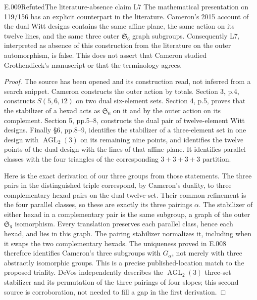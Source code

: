 \begin{saresult}{E.009}{Refuted}{The literature-absence claim L7}
The mathematical presentation on 119/156 has an explicit counterpart
in the literature. Cameron's 2015 account of the dual Witt designs
contains the same affine plane, the same action on its twelve lines,
and the same three outer $\mathfrak S_6$ graph subgroups. Consequently
L7, interpreted as absence of this construction from the literature on
the outer automorphism, is false. This does not assert that Cameron
studied Grothendieck's manuscript or that the terminology agrees.
\end{saresult}
\begin{proof}
The source has been opened and its construction read, not inferred
from a search snippet. Cameron \cite[\S2, pp.2--3]{Cameron2015}
constructs the outer action by totals. Section 3, p.4, constructs
$S(5,6,12)$ on two dual six-element sets. Section 4, p.5, proves that
the stabilizer of a hexad acts as $\mathfrak S_6$ on it and by the outer
action on its complement. Section 5, pp.5--8, constructs the dual pair
of twelve-element Witt designs. Finally \S6, pp.8--9, identifies the
stabilizer of a three-element set in one design with
$\operatorname{AGL}_2(3)$ on its remaining nine points, and identifies
the twelve points of the dual design with the lines of that affine
plane. It identifies parallel classes with the four triangles of the
corresponding $3+3+3+3$ partition.

Here is the exact derivation of our three groups from those statements.
The three pairs in the distinguished triple correspond, by Cameron's
duality, to three complementary hexad pairs on the dual twelve-set.
Their common refinement is the four parallel classes, so these are
exactly its three pairings $\alpha$. The stabilizer of either hexad
in a complementary pair is the same subgroup, a graph of the outer
$\mathfrak S_6$ isomorphism. Every translation preserves each parallel
class, hence each hexad, and lies in this graph. The pairing stabilizer
normalizes it, including when it swaps the two complementary hexads.
The uniqueness proved in E.008 therefore identifies Cameron's three
subgroups with $G_\alpha$, not merely with three abstractly isomorphic
groups. This is a precise published-location match to the proposed
triality. DeVos \cite[pp.6--8]{DeVosBlocks} independently describes the
$\operatorname{AGL}_2(3)$ three-set stabilizer and its permutation of
the three pairings of four slopes; this second source is corroboration,
not needed to fill a gap in the first derivation.
\end{proof}

